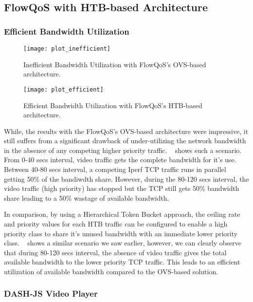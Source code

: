 \subsection{FlowQoS with HTB-based Architecture}
\label{sec:evaluation:htb}

\subsubsection{Efficient Bandwidth Utilization}

\begin{figure}[t]
    \texttt{[image: plot\_inefficient]}
    \caption{Inefficient Bandwidth Utilization with FlowQoS's OVS-based architecture.}
    \centering
    \label{fig:inefficient_bandwidth}
\end{figure}


\begin{figure}[t]
    \texttt{[image: plot\_efficient]}
    \caption{Efficient Bandwidth Utilization with FlowQoS's HTB-based architecture.}
    \centering
    \label{fig:efficient_bandwidth}
\end{figure}

While, the results with the FlowQoS's OVS-based architecture were impressive, it still suffers from a significant drawback of under-utilizing the network bandwidth in the absence of any competing higher priority traffic. ~ shows such a scenario. From 0-40 secs interval, video traffic gets the complete bandwidth for it's use. Between 40-80 secs interval, a competing Iperf TCP traffic runs in parallel getting 50\% of the bandiwdth share. However, during the 80-120 secs interval, the video traffic (high priority) has stopped but the TCP still gets 50\% bandwidth share leading to a 50\% wastage of available bandwidth.

In comparison, by using a Hierarchical Token Bucket approach, the ceiling rate and priority values for each HTB traffic can be configured to enable a high priority class to share it's unused bandwidth with an immediate lower priority class. ~ shows a similar scenario we saw earlier, however, we can clearly observe that during 80-120 secs interval, the absence of video traffic gives the total available bandwidth to the lower priority TCP traffic. This leads to an efficient utilization of available bandwidth compared to the OVS-based solution.



\subsubsection{DASH-JS Video Player}

